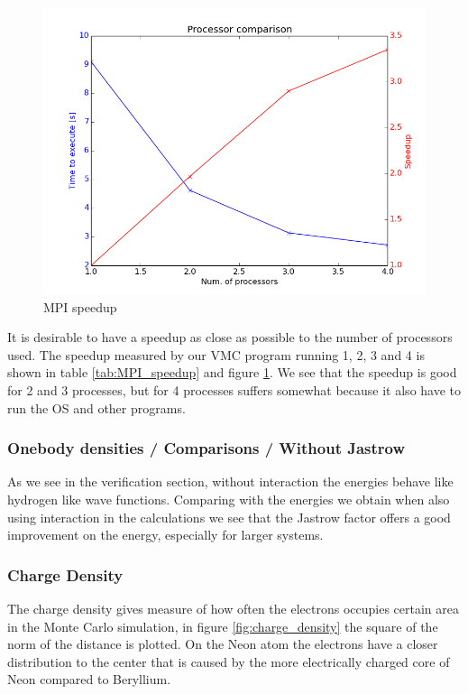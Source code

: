 \documentclass[11pt]{article}
\begin{document}
		\begin{figure}
		\centering \includegraphics[width=0.45\linewidth]{../figures/processor_number_time_comparison}
		\protect\caption{MPI speedup}
		\label{fig:MPI_speedup}
		\end{figure}

		It is desirable to have a speedup as close as possible to the number of processors used. The speedup measured by our VMC program running 1, 2, 3 and 4 is shown in table \ref{tab:MPI_speedup} and figure \ref{fig:MPI_speedup}. We see that the speedup is good for 2 and 3 processes, but for 4 processes suffers somewhat because it also have to run the OS and other programs.

	\subsubsection{Onebody densities / Comparisons / Without Jastrow}
		As we see in the verification section, without interaction the energies behave like hydrogen like wave functions. Comparing with the energies we obtain when also using interaction in the calculations we see that the Jastrow factor offers a good improvement on the energy, especially for larger systems.

	\subsubsection{Charge Density}
		The charge density gives measure of how often the electrons occupies certain area in the Monte Carlo simulation, in figure \ref{fig:charge_density} the square of the norm of the distance is plotted.
		On the Neon atom the electrons have a closer distribution to the center that is caused by the more electrically charged core of Neon compared to Beryllium.
\end{document}
